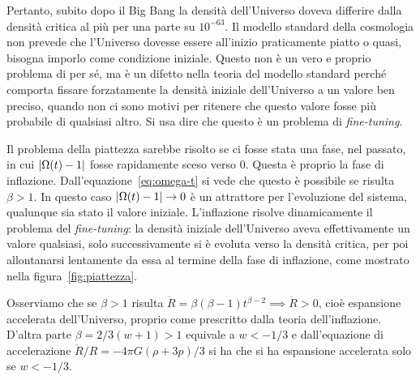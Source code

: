 Pertanto, subito dopo il Big Bang la densità dell'Universo doveva differire
dalla densità critica al più per una parte su \(10^{-63}\).  Il modello standard
della cosmologia non prevede che l'Universo dovesse essere all'inizio
praticamente piatto o quasi, bisogna imporlo come condizione iniziale.  Questo
non è un vero e proprio problema di per sé, ma è un difetto nella teoria del
modello standard perché comporta fissare forzatamente la densità iniziale
dell'Universo a un valore ben preciso, quando non ci sono motivi per ritenere
che questo valore fosse più probabile di qualsiasi altro.  Si usa dire che
questo è un problema di \emph{fine-tuning}.

Il problema della piattezza sarebbe risolto se ci fosse stata una fase, nel
passato, in cui \(\lvert\Omega(t) - 1\rvert\) fosse rapidamente sceso verso \(0\).
Questa è proprio la fase di inflazione.  Dall'equazione~\eqref{eq:omega-t} si
vede che questo è possibile se risulta \(\beta > 1\).  In questo caso
\(\lvert\Omega(t) - 1\rvert \to 0\) è un attrattore per l'evoluzione del sistema,
qualunque sia stato il valore iniziale.  L'inflazione risolve dinamicamente il
problema del \emph{fine-tuning}: la densità iniziale dell'Universo aveva
effettivamente un valore qualsiasi, solo successivamente si è evoluta verso la
densità critica, per poi allontanarsi lentamente da essa al termine della fase
di inflazione, come mostrato nella figura~\ref{fig:piattezza}.

Osserviamo che se \(\beta>1\) risulta \(\ddot{R} = \beta(\beta-1)t^{\beta-2}
\implies \ddot{R} > 0\), cioè espansione accelerata dell'Universo, proprio come
prescritto dalla teoria dell'inflazione.  D'altra parte \(\beta = 2/3(w+1)>1\)
equivale a \(w < -1/3\) e dall'equazione di accelerazione \(\ddot{R}/R=-4\pi
G(\rho+3p)/3\) si ha che si ha espansione accelerata solo se \(w < -1/3\).

